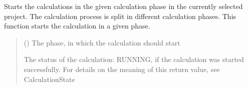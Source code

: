 \documentclass[letterpaper,10pt,english]{sphinxmanual}
\begin{document}
\begin{fulllineitems}
\begin{fulllineitems}
\begin{quote}
\begin{description}
\sphinxAtStartPar
{}

\end{description}\end{quote}

\end{fulllineitems}


\begin{fulllineitems}
\label{\detokenize{apidoc/src.osm_configurator.control:src.osm_configurator.control.control_interface.IControl.start_calculations}}
\pysigstartsignatures
{}
\pysigstopsignatures
\sphinxAtStartPar
Starts the calculations in the given calculation phase in the currently selected project.
The calculation process is split in different calculation phases. This function starts the calculation in a given phase.
\begin{quote}\begin{description}
\sphinxAtStartPar
{} ({\hyperref[\detokenize{apidoc/src.osm_configurator.model.project.calculation:src.osm_configurator.model.project.calculation.calculation_phase_enum.CalculationPhase}]{}}) \textendash{} The phase, in which the calculation should start

\sphinxAtStartPar
The status of the calculation: RUNNING, if the calculation was started successfully. For details on the meaning of this return value, see CalculationState

\sphinxAtStartPar
{\hyperref[\detokenize{apidoc/src.osm_configurator.model.project.calculation:src.osm_configurator.model.project.calculation.calculation_state_enum.CalculationState}]{}}

\end{description}\end{quote}

\end{fulllineitems}


\end{fulllineitems}
\end{document}
